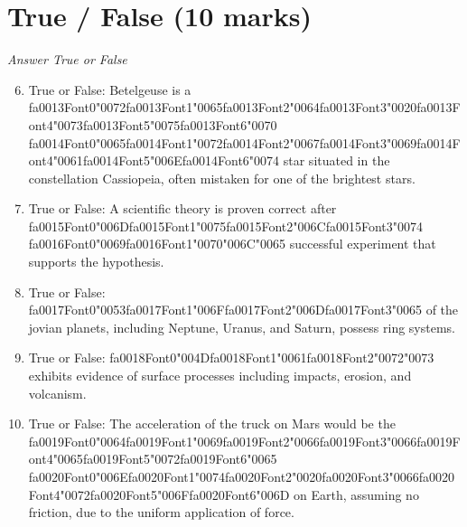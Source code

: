 \documentclass[12pt]{article}
\begin{document}
\section*{True / False (10 marks)}
\textit{Answer True or False}
\begin{enumerate}[label=\arabic*.]
\setcounter{enumi}{5}
\item True or False: Betelgeuse is a {\csname fa0013Font0\endcsname\char"0072}{\csname fa0013Font1\endcsname\char"0065}{\csname fa0013Font2\endcsname\char"0064}{\csname fa0013Font3\endcsname\char"0020}{\csname fa0013Font4\endcsname\char"0073}{\csname fa0013Font5\endcsname\char"0075}{\csname fa0013Font6\endcsname\char"0070} {\csname fa0014Font0\endcsname\char"0065}{\csname fa0014Font1\endcsname\char"0072}{\csname fa0014Font2\endcsname\char"0067}{\csname fa0014Font3\endcsname\char"0069}{\csname fa0014Font4\endcsname\char"0061}{\csname fa0014Font5\endcsname\char"006E}{\csname fa0014Font6\endcsname\char"0074} star situated in the constellation Cassiopeia, often mistaken for one of the brightest stars.
\item True or False: A scientific theory is proven correct after {\csname fa0015Font0\endcsname\char"006D}{\csname fa0015Font1\endcsname\char"0075}{\csname fa0015Font2\endcsname\char"006C}{\csname fa0015Font3\endcsname\char"0074} {\csname fa0016Font0\endcsname\char"0069}{\csname fa0016Font1\endcsname\char"0070}{\char"006C}{\char"0065} successful experiment that supports the hypothesis.
\item True or False: {\csname fa0017Font0\endcsname\char"0053}{\csname fa0017Font1\endcsname\char"006F}{\csname fa0017Font2\endcsname\char"006D}{\csname fa0017Font3\endcsname\char"0065} of the jovian planets, including Neptune, Uranus, and Saturn, possess ring systems.
\item True or False: {\csname fa0018Font0\endcsname\char"004D}{\csname fa0018Font1\endcsname\char"0061}{\csname fa0018Font2\endcsname\char"0072}{\char"0073} exhibits evidence of surface processes including impacts, erosion, and volcanism.
\item True or False: The acceleration of the truck on Mars would be the {\csname fa0019Font0\endcsname\char"0064}{\csname fa0019Font1\endcsname\char"0069}{\csname fa0019Font2\endcsname\char"0066}{\csname fa0019Font3\endcsname\char"0066}{\csname fa0019Font4\endcsname\char"0065}{\csname fa0019Font5\endcsname\char"0072}{\csname fa0019Font6\endcsname\char"0065} {\csname fa0020Font0\endcsname\char"006E}{\csname fa0020Font1\endcsname\char"0074}{\csname fa0020Font2\endcsname\char"0020}{\csname fa0020Font3\endcsname\char"0066}{\csname fa0020Font4\endcsname\char"0072}{\csname fa0020Font5\endcsname\char"006F}{\csname fa0020Font6\endcsname\char"006D} on Earth, assuming no friction, due to the uniform application of force.
\end{enumerate}
\end{document}
